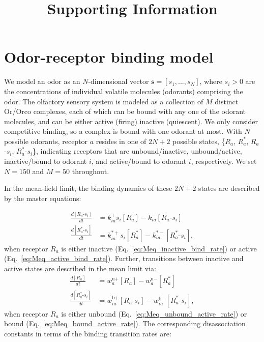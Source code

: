 \documentclass[letterpaper,12pt]{article}
\title{Supporting Information}
\begin{document}
	\maketitle
	
	\section*{Odor-receptor binding model}
	
	We model an odor as an $N$-dimensional vector ${\mathbf s=[ s_1,...,s_N]}$, where $s_i > 0$ are the concentrations of individual volatile molecules (odorants) comprising the odor. 
	The olfactory sensory system is modeled as a collection of $M$ distinct Or/Orco complexes, each of which can be bound with any one of the odorant molecules, and can be either active (firing) inactive (quiescent). We only consider competitive binding, so a complex is bound with one odorant at most. With $N$ possible odorants, receptor $a$ resides in one of $2N+2$ possible states, \{$R_a$, $R^*_a$, $R_a$-$s_i$, $R^*_a$-$s_i$\}, indicating receptors that are unbound/inactive, unbound/active, inactive/bound to odorant $i$, and active/bound to odorant $i$, respectively. We set $N = 150$ and $M = 50$ throughout.
	
	In the mean-field limit, the binding dynamics of these $2N + 2$ states are described by the master equations:
	
	\begin{align}
	\frac{d[R_a\text{-}s_i]}{dt} &= k^+_{ia}s_i[R_a] - k^-_{ia}[R_a\text{-}s_i] \label{eq:Meq_inactive_bind_rate}\\
	\frac{d[R^*_a\text{-}s_i]}{dt} &= k^{*+}_{ia}s_i[R^*_a] - k^{*-}_{ia}[R^*_a\text{-}s_i],
	\label{eq:Meq_active_bind_rate}
	\end{align}
	when receptor $R_a$ is either inactive (Eq.~\ref{eq:Meq_inactive_bind_rate}) or active (Eq.~\ref{eq:Meq_active_bind_rate}). Further, transitions between inactive and active states are described in the mean limit via:
	\begin{align}
	\frac{d[R_a]}{dt} &= w^{\text{u}+}_a [R_a] - w^{\text{u}-}_a [R^*_a] \label{eq:Meq_unbound_active_rate}\\
	\frac{d[R^*_a\text{-}s_i]}{dt} &=  w^{\text{b}+}_{ia} [R_a\text{-}s_i] - w^{\text{b}-}_{ia}  [R^*_a\text{-}s_i],
	\label{eq:Meq_bound_active_rate}
	\end{align}
	when receptor $R_a$ is either unbound (Eq.~\ref{eq:Meq_unbound_active_rate}) or bound (Eq.~\ref{eq:Meq_bound_active_rate}). The corresponding disassociation constants in terms of the binding transition rates are:
	
\end{document}
